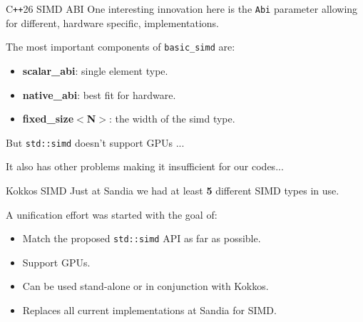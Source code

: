 \begin{frame}[fragile]{C\texttt{++}26 SIMD ABI}
One interesting innovation here is the \texttt{Abi} parameter allowing for different, hardware specific, implementations.

	\vspace{8pt}

The most important components of \texttt{basic\_simd} are:
\begin{itemize}
	\item{\textbf{scalar\_abi}: single element type.}
	\item{\textbf{native\_abi}: best fit for hardware.}
	\item{\textbf{fixed\_size$<$N$>$}: the width of the simd type.}
\end{itemize}

\pause
	\vspace{8pt}

	But \texttt{std::simd} doesn't support GPUs ...

	\pause
	\vspace{8pt}
	It also has other problems making it insufficient for our codes...
\end{frame}

\begin{frame}[fragile]{Kokkos SIMD}
   Just at Sandia we had at least \textbf{5} different SIMD types in use.

   \vspace{8pt}
   A unification effort was started with the goal of:
   \begin{itemize}
      \item{Match the proposed \texttt{std::simd} API as far as possible.}
      \item{Support GPUs.}
      \item{Can be used stand-alone or in conjunction with Kokkos.}
      \item{Replaces all current implementations at Sandia for SIMD.}
   \end{itemize}

\end{frame}

